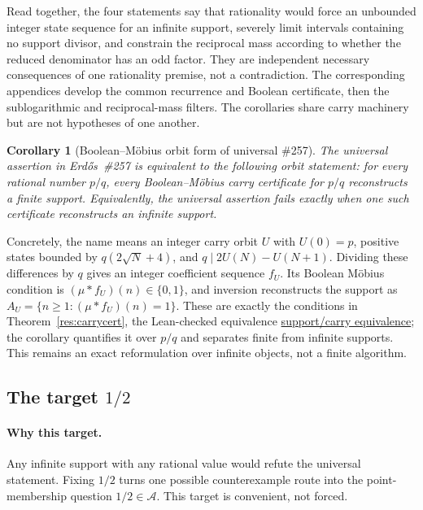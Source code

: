 \documentclass[11pt]{article}
\newcommand{\commit}{bb4e24651b37cd096d3749ef299c3317930b3a3b}
\newcommand{\repobase}{https://github.com/wcook04/plectis-lean-erdos249-257/blob/\commit}
\newcommand{\PK}{Erdos249257}
\newcommand{\lword}[4]{\href{\repobase/\PK/#1\#L#2}{#4}}
\newtheorem{corollary}[theorem]{Corollary}
\theoremstyle{definition}
\theoremstyle{remark}
\begin{document}
Read together, the four statements say that rationality would force an
unbounded integer state sequence for an infinite support, severely limit
intervals containing no support divisor, and constrain the reciprocal mass
according to whether the reduced denominator has an odd factor.  They are
independent necessary consequences of one rationality premise, not a
contradiction.
The corresponding appendices develop the common recurrence and Boolean
certificate, then the sublogarithmic and reciprocal-mass filters.  The
corollaries share carry machinery but are not hypotheses of one another.

\begin{corollary}[Boolean--M\"obius orbit form of universal \#257]
\label{res:universal-boolean-obstruction}
The universal assertion in Erd\H{o}s~\#257 is equivalent to the following
orbit statement: for every rational number \(p/q\), every
Boolean--M\"obius carry certificate for \(p/q\) reconstructs a finite
support.  Equivalently, the universal assertion fails exactly when one such
certificate reconstructs an infinite support.
\end{corollary}
\noindent Concretely, the name means an integer carry orbit \(U\) with
\(U(0)=p\), positive states bounded by \(q(2\sqrt N+4)\), and
\(q\mid 2U(N)-U(N+1)\).  Dividing these differences by \(q\) gives an
integer coefficient sequence \(f_U\).  Its Boolean M\"obius condition is
\((\mu*f_U)(n)\in\{0,1\}\), and inversion reconstructs the support as
\(A_U=\{n\geq1:(\mu*f_U)(n)=1\}\).  These are exactly the conditions in
Theorem~\ref{res:carrycert}, the Lean-checked equivalence
\lword{BooleanMobiusCarry.lean}{949}{exists_normalized_support_fraction_iff_exists_booleanMobiusCarry}{support/carry equivalence};
the corollary quantifies it over \(p/q\) and separates finite from infinite
supports.  This remains an exact reformulation over infinite objects, not a
finite algorithm.

\subsection{The target \(1/2\)}

\paragraph{Why this target.}
Any infinite support with any rational value would refute the universal
statement.  Fixing \(1/2\) turns one possible counterexample route into the
point-membership question \(1/2\in\mathcal A\).  This target is convenient,
not forced.
\end{document}
